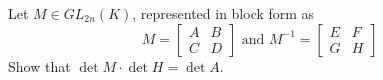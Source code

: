 Let \(M \in GL_{2n}(K)\), represented in block form as \[ M = \left[ \begin{array}{cc} A & B \\ C & D \end{array} \right] \text{ and } M^{-1} = \left[ \begin{array}{cc} E & F \\ G & H \end{array} \right] \]
Show that \(\det M \cdot \det H = \det A\).